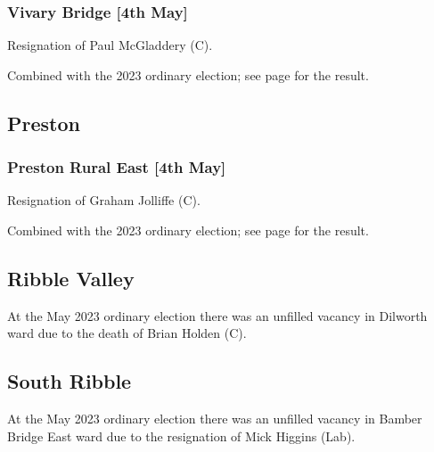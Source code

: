 \documentclass[a4paper,openany]{book}
\begin{document}
\begin{resultsiii}
\subsubsection*{Vivary Bridge \hspace*{\fill}\nolinebreak[1]%
	\enspace\hspace*{\fill}
	[4th May]}


Resignation of Paul McGladdery (C).

Combined with the 2023 ordinary election; see page \pageref{VivaryBridgePendle} for the result.

\subsection*{Preston}

\subsubsection*{Preston Rural East \hspace*{\fill}\nolinebreak[1]%
	\enspace\hspace*{\fill}
	[4th May]}


Resignation of Graham Jolliffe (C).

Combined with the 2023 ordinary election; see page \pageref{PrestonPrestonRuralEast} for the result.

\subsection*{Ribble Valley}

At the May 2023 ordinary election there was an unfilled vacancy in Dilworth ward due to the death of Brian Holden (C).%

\subsection*{South Ribble}

At the May 2023 ordinary election there was an unfilled vacancy in Bamber Bridge East ward due to the resignation of Mick Higgins (Lab).%


\end{resultsiii}
\end{document}
